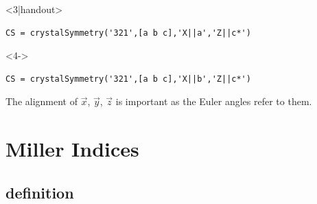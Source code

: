 \documentclass[compress]{beamer}
\begin{document}
\begin{frame}[fragile]
\begin{overlayarea}{\textwidth}{8cm}
\begin{columns}
\begin{column}{4.5cm}
\end{column}
\end{columns}

\begin{onlyenv}<3|handout>
  \begin{lstlisting}[style=input]
CS = crystalSymmetry('321',[a b c],'X||a','Z||c*')
  \end{lstlisting}
\end{onlyenv}

\begin{onlyenv}<4->
  \begin{lstlisting}[style=input]
CS = crystalSymmetry('321',[a b c],'X||b','Z||c*')
\end{lstlisting}
\alert{The alignment of $\vec x$, $\vec y$, $\vec z$ is important as the Euler angles
refer to them.}
\end{onlyenv}

\end{overlayarea}

\end{frame}

\section{Miller Indices}
\label{sec:miller-indices}

\subsection*{definition}
\label{sec:definition}
\end{document}
